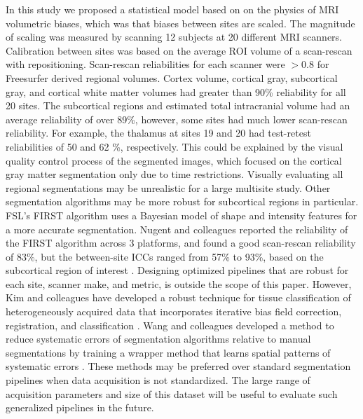 In this study we proposed a statistical model based on on the physics of MRI volumetric biases, which was that biases between sites are scaled. The magnitude of scaling was measured by scanning 12 subjects at 20 different MRI scanners. Calibration between sites was based on the average ROI volume of a scan-rescan with repositioning. Scan-rescan reliabilities for each scanner were $>0.8$ for Freesurfer derived regional volumes. Cortex volume, cortical gray, subcortical gray, and cortical white matter volumes had greater than 90\% reliability for all 20 sites. The subcortical regions and estimated total intracranial volume had an average reliability of over 89\%, however, some sites had much lower scan-rescan reliability. For example, the thalamus at sites 19 and 20 had test-retest reliabilities of 50 and 62 \%, respectively. This could be explained by the visual quality control process of the segmented images, which focused on the cortical gray matter segmentation only due to time restrictions. Visually evaluating all regional segmentations may be unrealistic for a large multisite study. Other segmentation algorithms may be more robust for subcortical regions in particular. FSL's FIRST algorithm \cite{firstcitation} uses a Bayesian model of shape and intensity features for a more accurate segmentation. Nugent and colleagues reported the reliability of the FIRST algorithm across 3 platforms, and found a good scan-rescan reliability of 83\%, but the between-site ICCs ranged from 57\% to 93\%, based on the subcortical region of interest \cite{firstreliability}. Designing optimized pipelines that are robust for each site, scanner make, and metric, is outside the scope of this paper. However, Kim and colleagues have developed a robust technique for tissue classification of heterogeneously acquired data that incorporates iterative bias field correction, registration, and classification \cite{optimize}. Wang and colleagues developed a method to reduce systematic errors of segmentation algorithms relative to manual segmentations by training a wrapper method that learns spatial patterns of systematic errors \cite{Wang2011}. These methods may be preferred over standard segmentation pipelines when data acquisition is not standardized. The large range of acquisition parameters and size of this dataset will be useful to evaluate such generalized pipelines in the future.